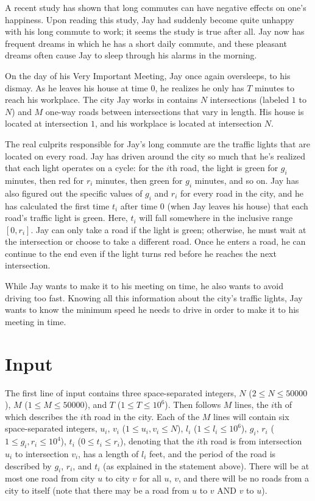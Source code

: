 
A recent study has shown that long commutes can have negative effects on one's happiness. Upon reading
this study, Jay had suddenly become quite unhappy with his long commute to work; it seems the study is
true after all. Jay now has frequent dreams in which he has a short daily commute, and these pleasant
dreams often cause Jay to sleep through his alarms in the morning.

On the day of his Very Important Meeting, Jay once again oversleeps, to his dismay. As he leaves his house
at time $0$, he realizes he only has $T$ minutes to reach his workplace. The city Jay works in contains
$N$ intersections (labeled $1$ to $N$) and $M$ one-way roads between intersections that vary in length.
His house is located at intersection $1$, and his workplace is located at intersection $N$.

The real culprits responsible for Jay's long commute are the traffic lights that are located on every road.
Jay has driven around the city so much that he's realized that each light operates on a cycle: for the $i$th
road, the light is green for $g_i$ minutes, then red for $r_i$ minutes, then green for $g_i$ minutes, and so 
on. Jay has also figured out the specific values of $g_i$ and $r_i$ for every road in the city, and he has
calculated the first time $t_i$ after time $0$ (when Jay leaves his house) that each road's traffic light is
green. Here, $t_i$ will fall somewhere in the inclusive range $[0, r_i]$. Jay can only take a road if the
light is green; otherwise, he must wait at the intersection or choose to take a different road. Once he
enters a road, he can continue to the end even if the light turns red before he reaches the next
intersection.

While Jay wants to make it to his meeting on time, he also wants to avoid driving too fast. Knowing all
this information about the city's traffic lights, Jay wants to know the minimum speed he needs to drive
in order to make it to his meeting in time.

\section*{Input}

The first line of input contains three space-separated integers, $N$ ($2 \leq N \leq 50000$), $M$
($1 \leq M \leq 50000$), and $T$ ($1 \leq T \leq 10^6$). Then follows $M$ lines, the $i$th of which
describes the $i$th road in the city. Each of the $M$ lines will contain six space-separated integers,
$u_i$, $v_i$ ($1 \leq u_i, v_i \leq N$), $l_i$ ($1 \leq l_i \leq 10^6$), $g_i$, $r_i$
($1 \leq g_i, r_i \leq 10^4$), $t_i$ ($0 \leq t_i \leq r_i$), denoting that the $i$th road is from
intersection $u_i$ to intersection $v_i$, has a length of $l_i$ feet, and the period of the road is
described by $g_i$, $r_i$, and $t_i$ (as explained in the statement above). There will be at most one road
from city $u$ to city $v$ for all $u$, $v$, and there will be no roads from a city to itself (note that
there may be a road from $u$ to $v$ AND $v$ to $u$).

